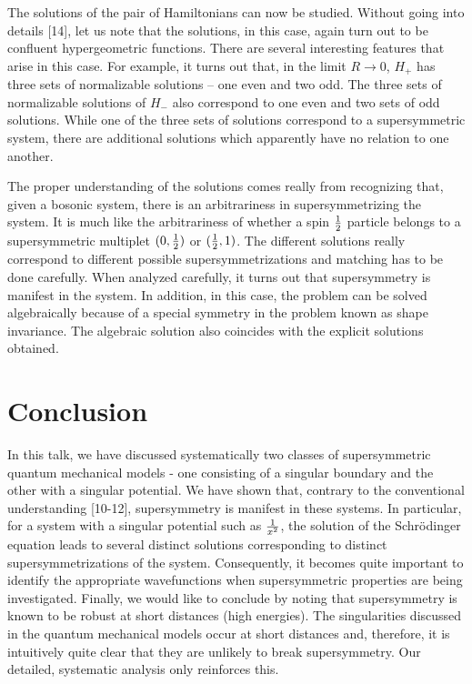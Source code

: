 \documentclass[a4paper,11pt]{article}
\begin{document}
The solutions of the pair of Hamiltonians can now be studied. Without
going into details [14], let us note that the solutions, in this case,
again turn out to be confluent hypergeometric functions. There are
several interesting features that arise in this case. For example, it
turns out that, in the limit $R\rightarrow 0$, $H_{+}$ has three sets
of normalizable solutions -- one even and two odd. The three
sets of normalizable solutions of $H_{-}$ also correspond to one even
and two sets of odd solutions. While one of the three sets of
solutions correspond to a supersymmetric system, there are additional
solutions which apparently have no relation to one another.

The proper understanding of the solutions comes really from
recognizing that, given a bosonic system, there is an arbitrariness in
supersymmetrizing the system. It is much like the arbitrariness of
whether a spin ${1\over 2}$ particle belongs to a supersymmetric
multiplet $(0,{1\over 2})$ or $({1\over 2},1)$. The different
solutions really correspond to different possible supersymmetrizations
and matching has to be done carefully. When analyzed carefully, it
turns out that supersymmetry is manifest in the system. In addition,
in this case, the problem can be solved algebraically because of a
special symmetry in the problem known as shape invariance. The
algebraic solution also coincides with the explicit solutions obtained. 


\section{Conclusion}
In this talk, we have discussed systematically two classes of
supersymmetric quantum  mechanical models - one consisting of a
singular boundary and the other with a singular potential. We have
shown that, contrary to the conventional understanding [10-12], supersymmetry
is manifest in these systems. In particular, for a system with a
singular potential such as ${1\over x^{2}}$,  the
solution of the Schr\"{o}dinger equation leads to several distinct
solutions corresponding to distinct supersymmetrizations of the
system. Consequently, it becomes quite important to identify the
appropriate wavefunctions when supersymmetric properties are being
investigated. Finally, we would like to conclude by noting that
supersymmetry is known to be robust at short distances (high
energies). The singularities discussed in the quantum mechanical
models occur at short distances  and, therefore, it is intuitively quite
clear that they are unlikely to break supersymmetry. Our detailed,
systematic analysis only reinforces this.    
\end{document}
